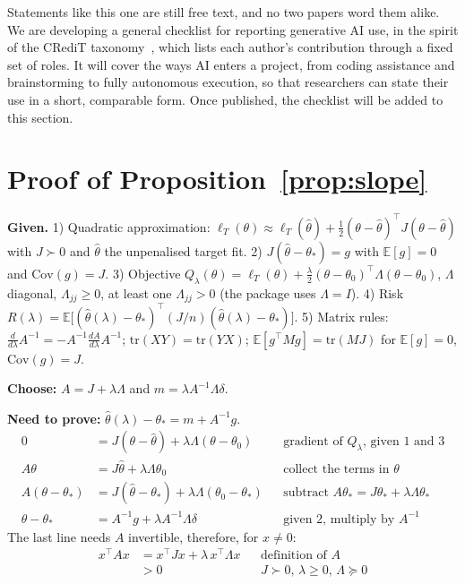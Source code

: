 \documentclass{article}
\begin{document}
Statements like this one are still free text, and no two papers word them alike. We are developing a general checklist for reporting generative AI use, in the spirit of the CRediT taxonomy~\citep{brand2015}, which lists each author's contribution through a fixed set of roles. It will cover the ways AI enters a project, from coding assistance and brainstorming to fully autonomous execution, so that researchers can state their use in a short, comparable form. Once published, the checklist will be added to this section.




\appendix

\section{Proof of Proposition~\ref{prop:slope}}
\label{app:proof}

\textbf{Given.}
1) Quadratic approximation: $\ell_T(\theta) \approx \ell_T(\hat\theta) + \tfrac12 (\theta-\hat\theta)^\top J (\theta-\hat\theta)$ with $J \succ 0$ and $\hat\theta$ the unpenalised target fit.
2) $J(\hat\theta - \theta_*) = g$ with $\mathbb{E}[g] = 0$ and $\mathrm{Cov}(g) = J$.
3) Objective $Q_\lambda(\theta) = \ell_T(\theta) + \tfrac{\lambda}{2}(\theta-\theta_0)^\top\Lambda(\theta-\theta_0)$, $\Lambda$ diagonal, $\Lambda_{jj} \ge 0$, at least one $\Lambda_{jj} > 0$ (the package uses $\Lambda = I$).
4) Risk $R(\lambda) = \mathbb{E}\bigl[(\hat\theta(\lambda)-\theta_*)^\top (J/n) (\hat\theta(\lambda)-\theta_*)\bigr]$.
5) Matrix rules: $\tfrac{d}{d\lambda}A^{-1} = -A^{-1}\tfrac{dA}{d\lambda}A^{-1}$; $\mathrm{tr}(XY) = \mathrm{tr}(YX)$; $\mathbb{E}[g^\top M g] = \mathrm{tr}(MJ)$ for $\mathbb{E}[g] = 0$, $\mathrm{Cov}(g) = J$.

\textbf{Choose:} $A = J + \lambda\Lambda$ and $m = \lambda A^{-1}\Lambda\delta$.

\textbf{Need to prove:} $\hat\theta(\lambda) - \theta_* = m + A^{-1}g$.
\begin{align*}
0 &= J(\theta-\hat\theta) + \lambda\Lambda(\theta-\theta_0) && \text{gradient of $Q_\lambda$, given 1 and 3}\\
A\theta &= J\hat\theta + \lambda\Lambda\theta_0 && \text{collect the terms in $\theta$}\\
A(\theta-\theta_*) &= J(\hat\theta-\theta_*) + \lambda\Lambda(\theta_0-\theta_*) && \text{subtract $A\theta_* = J\theta_* + \lambda\Lambda\theta_*$}\\
\theta-\theta_* &= A^{-1}g + \lambda A^{-1}\Lambda\delta && \text{given 2, multiply by $A^{-1}$}
\end{align*}
The last line needs $A$ invertible, therefore, for $x \ne 0$:
\begin{align*}
x^\top A x &= x^\top J x + \lambda\, x^\top \Lambda x && \text{definition of $A$}\\
&> 0 && \text{$J \succ 0$, $\lambda \ge 0$, $\Lambda \succeq 0$}
\end{align*}
\end{document}
